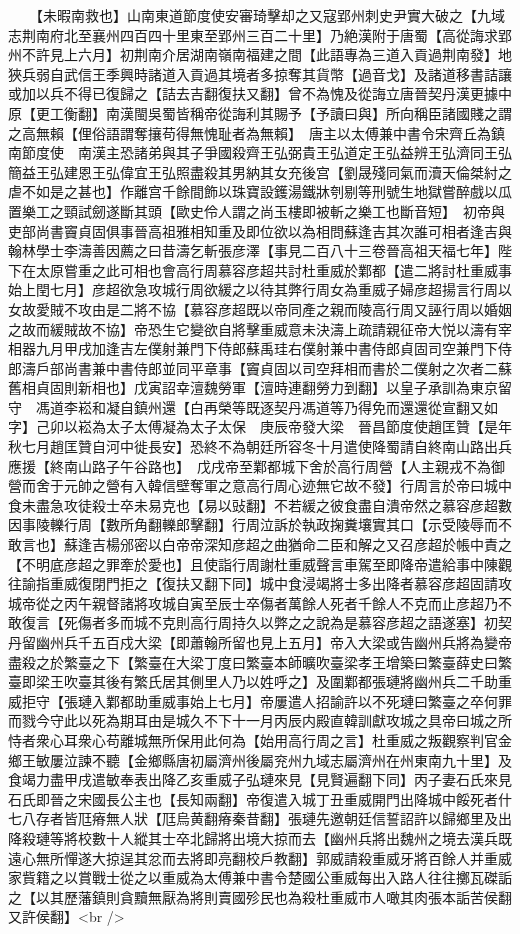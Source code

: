 　　【未暇南救也】山南東道節度使安審琦擊却之又寇郢州刺史尹實大破之【九域志荆南府北至襄州四百四十里東至郢州三百二十里】乃絶漢附于唐蜀【高從誨求郢州不許見上六月】初荆南介居湖南嶺南福建之間【此語專為三道入貢過荆南發】地狹兵弱自武信王季興時諸道入貢過其境者多掠奪其貨幣【過音戈】及諸道移書詰讓或加以兵不得已復歸之【詰去吉翻復扶又翻】曾不為愧及從誨立唐晉契丹漢更據中原【更工衡翻】南漢閩吳蜀皆稱帝從誨利其賜予【予讀曰與】所向稱臣諸國賤之謂之高無賴【俚俗語謂奪攘苟得無愧耻者為無賴】　唐主以太傅兼中書令宋齊丘為鎮南節度使　南漢主恐諸弟與其子爭國殺齊王弘弼貴王弘道定王弘益辨王弘濟同王弘簡益王弘建恩王弘偉宜王弘照盡殺其男納其女充後宫【劉晟殘同氣而瀆天倫桀紂之虐不如是之甚也】作離宫千餘間飾以珠寶設鑊湯鐵牀刳剔等刑號生地獄嘗醉戲以瓜置樂工之頸試劒遂斷其頭【歐史伶人謂之尚玉樓即被斬之樂工也斷音短】　初帝與吏部尚書竇貞固俱事晉高祖雅相知重及即位欲以為相問蘇逢吉其次誰可相者逢吉與翰林學士李濤善因薦之曰昔濤乞斬張彦澤【事見二百八十三卷晉高祖天福七年】陛下在太原嘗重之此可相也會高行周慕容彦超共討杜重威於鄴都【遣二將討杜重威事始上閏七月】彦超欲急攻城行周欲緩之以待其弊行周女為重威子婦彦超揚言行周以女故愛賊不攻由是二將不協【慕容彦超既以帝同產之親而陵高行周又誣行周以婚姻之故而緩賊故不協】帝恐生它變欲自將擊重威意未決濤上疏請親征帝大悦以濤有宰相器九月甲戌加逢吉左僕射兼門下侍郎蘇禹珪右僕射兼中書侍郎貞固司空兼門下侍郎濤戶部尚書兼中書侍郎並同平章事【竇貞固以司空拜相而書於二僕射之次者二蘇舊相貞固則新相也】戊寅詔幸澶魏勞軍【澶時連翻勞力到翻】以皇子承訓為東京留守　馮道李崧和凝自鎮州還【白再榮等既逐契丹馮道等乃得免而還還從宣翻又如字】己卯以崧為太子太傅凝為太子太保　庚辰帝發大梁　晉昌節度使趙匡贊【是年秋七月趙匡贊自河中徙長安】恐終不為朝廷所容冬十月遣使降蜀請自終南山路出兵應援【終南山路子午谷路也】　戊戌帝至鄴都城下舍於高行周營【人主親戎不為御營而舍于元帥之營有入韓信壁奪軍之意高行周心迹無它故不發】行周言於帝曰城中食未盡急攻徒殺士卒未易克也【易以䜴翻】不若緩之彼食盡自潰帝然之慕容彦超數因事陵轢行周【數所角翻轢郎擊翻】行周泣訴於執政掬糞壤實其口【示受陵辱而不敢言也】蘇逢吉楊邠密以白帝帝深知彦超之曲猶命二臣和解之又召彦超於帳中責之【不明底彦超之罪牽於愛也】且使詣行周謝杜重威聲言車駕至即降帝遣給事中陳觀往諭指重威復閉門拒之【復扶又翻下同】城中食浸竭將士多出降者慕容彦超固請攻城帝從之丙午親督諸將攻城自寅至辰士卒傷者萬餘人死者千餘人不克而止彦超乃不敢復言【死傷者多而城不克則高行周持久以弊之之說為是慕容彦超之語遂塞】初契丹留幽州兵千五百戍大梁【即蕭翰所留也見上五月】帝入大梁或告幽州兵將為變帝盡殺之於繁臺之下【繁臺在大梁丁度曰繁臺本師曠吹臺梁孝王增築曰繁臺薛史曰繁臺即梁王吹臺其後有繁氏居其側里人乃以姓呼之】及圍鄴都張璉將幽州兵二千助重威拒守【張璉入鄴都助重威事始上七月】帝屢遣人招諭許以不死璉曰繁臺之卒何罪而戮今守此以死為期耳由是城久不下十一月丙辰内殿直韓訓獻攻城之具帝曰城之所恃者衆心耳衆心苟離城無所保用此何為【始用高行周之言】杜重威之叛觀察判官金鄉王敏屢泣諫不聽【金鄉縣唐初屬濟州後屬兖州九域志屬濟州在州東南九十里】及食竭力盡甲戌遣敏奉表出降乙亥重威子弘璉來見【見賢遍翻下同】丙子妻石氏來見石氏即晉之宋國長公主也【長知兩翻】帝復遣入城丁丑重威開門出降城中餒死者什七八存者皆尫瘠無人狀【尫烏黄翻瘠秦昔翻】張璉先邀朝廷信誓詔許以歸鄉里及出降殺璉等將校數十人縱其士卒北歸將出境大掠而去【幽州兵將出魏州之境去漢兵既遠心無所憚遂大掠逞其忿而去將即亮翻校戶教翻】郭威請殺重威牙將百餘人并重威家貲籍之以賞戰士從之以重威為太傅兼中書令楚國公重威每出入路人往往擲瓦磔詬之【以其歷藩鎮則貪黷無厭為將則賣國殄民也為殺杜重威市人噉其肉張本詬苦侯翻又許侯翻】<br />
